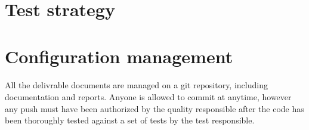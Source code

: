 \documentclass{report}
\begin{document}
\section{Test strategy}

\paragraph{}
\hspace{4mm}\textnormal{}

\section{Configuration management}

\paragraph{}
\hspace{4mm}\textnormal{All the delivrable documents are managed on a git repository, including documentation and reports.
Anyone is allowed to commit at anytime, however any push must have been authorized by the quality responsible after the code
has been thoroughly tested against a set of tests by the test responsible.}
\end{document}
